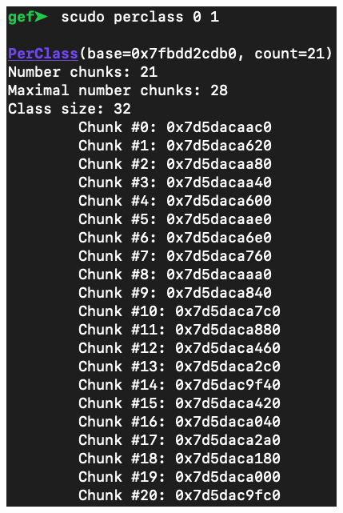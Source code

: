 \documentclass[a4paper,11pt,oneside]{report}
\begin{document}
\begin{figure}[h!]
\centering
\begin{minipage}{.5\textwidth}
  \centering
  \includegraphics[width=.95\linewidth]{figures/ScudoV3MobilePlusPerClassAfter.png}
  \label{fig:ScudoV3MobilePlusPerClassAfter}
\end{minipage}%
\begin{minipage}{.5\textwidth}
  \centering

\end{minipage}
\end{figure}
\end{document}
